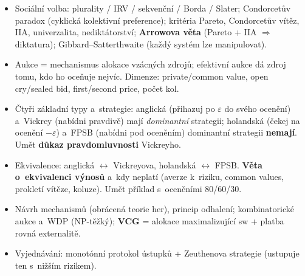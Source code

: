 \documentclass[11pt,a4paper]{article}
\theoremstyle{definition}
\begin{document}
\begin{itemize}
 \emph{protihráč} indiferentní.
\item Sociální volba: plurality / IRV / sekvenční / Borda / Slater; Condorcetův paradox
 (cyklická kolektivní preference); kritéria Pareto, Condorcetův vítěz, IIA, univerzalita,
 nediktátorství; \textbf{Arrowova věta} (Pareto + IIA $\Rightarrow$ diktatura);
 Gibbard--Satterthwaite (každý systém lze manipulovat).
\item Aukce = mechanismus alokace vzácných zdrojů; efektivní aukce dá zdroj tomu, kdo ho oceňuje
 nejvíc. Dimenze: private/common value, open cry/sealed bid, first/second price, počet kol.
\item Čtyři základní typy a~strategie: anglická (přihazuj po $\varepsilon$ do svého ocenění)
 a~Vickrey (nabídni pravdivě) mají \emph{dominantní} strategii; holandská (čekej na ocenění
 $-\varepsilon$) a~FPSB (nabídni pod oceněním) dominantní strategii \textbf{nemají}.
 Umět \textbf{důkaz pravdomluvnosti} Vickreyho.
\item Ekvivalence: anglická $\leftrightarrow$ Vickreyova, holandská $\leftrightarrow$ FPSB.
 \textbf{Věta o~ekvivalenci výnosů} a~kdy neplatí (averze k~riziku, common values, prokletí
 vítěze, koluze). Umět příklad s~oceněními 80/60/30.
\item Návrh mechanismů (obrácená teorie her), princip odhalení; kombinatorické aukce a~WDP
 (NP-těžký); \textbf{VCG} = alokace maximalizující sw + platba rovná externalitě.
\item Vyjednávání: monotónní protokol ústupků + Zeuthenova strategie (ustupuje ten s~nižším
 rizikem).
\end{itemize}
\end{document}
